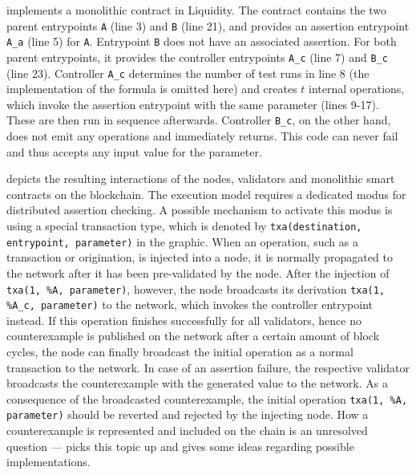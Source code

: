  implements a monolithic contract in Liquidity. The contract contains the two parent entrypoints \texttt{A} (line 3) and \texttt{B} (line 21), and provides an assertion entrypoint \texttt{A\_a} (line 5) for \texttt{A}. Entrypoint \texttt{B} does not have an associated assertion. For both parent entrypoints, it provides the controller entrypoints \texttt{A\_c} (line 7) and \texttt{B\_c} (line 23). Controller \texttt{A\_c} determines the number of test runs in line 8 (the implementation of the formula is omitted here) and creates $t$ internal operations, which invoke the assertion entrypoint with the same parameter (lines 9-17). These are then run in sequence afterwards. Controller \texttt{B\_c}, on the other hand, does not emit any operations and immediately returns. This code can never fail and thus accepts any input value for the parameter.


 depicts the resulting interactions of the nodes, validators and monolithic smart contracts on the blockchain. The execution model requires a dedicated modus for distributed assertion checking. A possible mechanism to activate this modus is using a special transaction type, which is denoted by \texttt{txa(destination, entrypoint, parameter)} in the graphic. When an operation, such as a transaction or origination, is injected into a node, it is normally propagated to the network after it has been pre-validated by the node. After the injection of \texttt{txa(1, \%A, parameter)}, however, the node broadcasts its derivation \texttt{txa(1, \%A\_c, parameter)} to the network, which invokes the controller entrypoint instead. If this operation finishes successfully for all validators, hence no counterexample is published on the network after a certain amount of block cycles, the node can finally broadcast the initial operation as a normal transaction to the network. In case of an assertion failure, the respective validator broadcasts the counterexample with the generated value to the network. As a consequence of the broadcasted counterexample, the initial operation \texttt{txa(1, \%A, parameter)} should be reverted and rejected by the injecting node. How a counterexample is represented and included on the chain is an unresolved question ---  picks this topic up and gives some ideas regarding possible implementations. 

